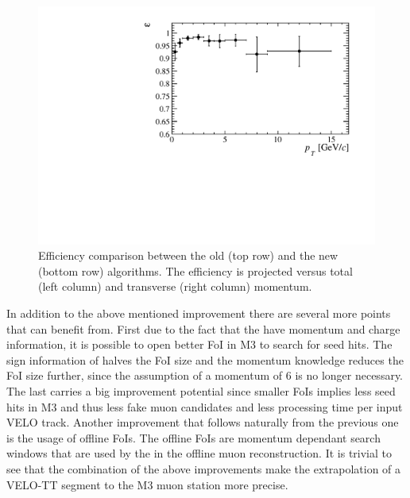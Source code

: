 \begin{figure}[!h]
 \includegraphics[trim=0.4cm 0.1cm 0.5cm 0.3cm, clip=true,scale=0.33]{Figures/Chapter3/MvTTM/vim_efficiency_pt.pdf}

 \caption{ Efficiency comparison between the old \mvm (top row) and the new \mvTTm (bottom row) algorithms.
 The efficiency is projected versus total (left column) and transverse (right column) momentum.  }
 \label{fig:mvm_eff}
\end{figure}

In addition to the above mentioned improvement there are several more points that \mvm can benefit from.
First due to the fact that the \veloTTCand have momentum and charge information, it is possible to open better
FoI in M3 to search for seed hits. The sign information of \veloTTCand halves the FoI size
and the momentum knowledge reduces the FoI size further, since the assumption of a momentum of 6 \mev
is no longer necessary. The last carries a big improvement potential
since smaller FoIs implies less seed hits in M3 and thus less fake muon candidates and less processing time per input VELO track.
Another improvement that follows naturally from the previous one is the usage of offline FoIs.
The offline FoIs are momentum dependant search windows that are used
by the \muonID in the offline muon reconstruction. It is trivial to see that the combination of the above improvements
make the extrapolation of a VELO-TT segment to the M3 muon station more precise.




